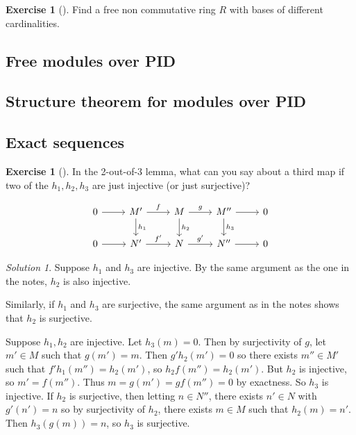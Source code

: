 \documentclass[reqno]{amsart}
\theoremstyle{definition}
\newtheorem{exercise}[theorem]{Exercise}
\theoremstyle{remark}
\newtheorem*{solution}{Solution}
\begin{document}
        \begin{exercise}[]
            Find a free non commutative ring $R$ with
            bases of different cardinalities.
        \end{exercise}

        \subsection{Free modules over PID}

        \subsection{Structure theorem for modules over
        PID}
        \subsection{Exact sequences}

        \begin{exercise}[]
            In the 2-out-of-3 lemma, what can
            you say about a third map if
            two of the $h_1,h_2,h_3$ are just
            injective (or just surjective)?

            \begin{equation*}
            \begin{tikzcd}
                0 \ar[r] & M' \ar[r, "f"]
                \ar[d, "h_1"] & M \ar[r, "g"] 
                \ar[d, "h_2"] &
                M'' \ar[r] \ar[d, "h_3"] & 0\\
                0 \ar[r] & N' \ar[r, "f'"] & N \ar[r, "g'"] &
                N'' \ar[r] & 0
            \end{tikzcd}
            \end{equation*}
        \end{exercise}


        \begin{solution}
            Suppose $h_1$ and $h_3$ are injective.
            By the same argument as the one in
            the notes, $h_2$ is also injective.

            Similarly, if $h_1$ and $h_3$ are surjective, the
            same argument as in the notes shows that
            $h_2$ is surjective.

            Suppose $h_1,h_2$ are injective. Let
            $h_3 (m) = 0$. Then
            by surjectivity of $g$,
            let $m' \in M$ such that
            $g(m') = m$. Then $g' h_2 (m') = 0$ so
            there exists  $m'' \in M'$ such that
            $f' h_1 (m'') = h_2 (m')$, so
            $h_2 f (m'') = h_2 (m')$. But
            $h_2$ is injective, so
            $m' = f(m'')$. Thus
            $m = g(m') = gf (m'') = 0$ by exactness.
            So $h_3$ is injective.
            If $h_2$ is surjective, then
            letting $n \in N''$, there exists
            $n' \in N$ with $g' (n') = n$ so by
            surjectivity of
            $h_2$, there exists $m \in M$ such that
            $h_2 (m) = n'$. Then
            $h_3 \left( g(m) \right) = n$, so
            $h_3$ is surjective.
        \end{solution}
\end{document}
